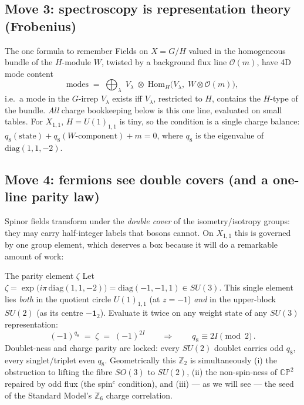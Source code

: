 \documentclass[11pt]{article}
\newcommand{\X}{X_{1,1}}
\newcommand{\CP}{\mathbb{CP}}
\begin{document}
\subsection{Move 3: spectroscopy is representation theory (Frobenius)}

\begin{toolbox}{The one formula to remember}
Fields on $X=G/H$ valued in the homogeneous bundle of the $H$-module $W$, twisted by a
background flux line $\mathcal O(m)$, have 4D mode content
\[
\text{modes} \;=\; \bigoplus_{\lambda}\; V_\lambda \;\otimes\;
\mathrm{Hom}_H\!\big(V_\lambda,\; W\otimes \mathcal O(m)\big),
\]
i.e.\ a mode in the $G$-irrep $V_\lambda$ exists iff $V_\lambda$, restricted to $H$, contains
the $H$-type of the bundle. \emph{All} charge bookkeeping below is this one line, evaluated
on small tables. For $\X$, $H=U(1)_{1,1}$ is tiny, so the condition is a single charge
balance: $q_8(\text{state}) + q_8(W\text{-component}) + m = 0$, where $q_8$ is the eigenvalue
of $\mathrm{diag}(1,1,-2)$.
\end{toolbox}

\subsection{Move 4: fermions see double covers (and a one-line parity law)}

Spinor fields transform under the \emph{double cover} of the isometry/isotropy groups: they
may carry half-integer labels that bosons cannot. On $\X$ this is governed by one group
element, which deserves a box because it will do a remarkable amount of work:

\begin{toolbox}{The parity element $\zeta$}
Let $\zeta=\exp\big(i\pi\,\mathrm{diag}(1,1,-2)\big)=\mathrm{diag}(-1,-1,1)\in SU(3)$.
This single element lies \emph{both} in the quotient circle $U(1)_{1,1}$ (at $z=-1$)
\emph{and} in the upper-block $SU(2)$ (as its centre $-\mathbf 1_2$). Evaluate it twice on
any weight state of any $SU(3)$ representation:
\[
(-1)^{q_8} \;=\; \zeta \;=\; (-1)^{2I}
\qquad\Longrightarrow\qquad
\boxed{\,q_8 \equiv 2I \pmod 2\,}.
\]
Doublet-ness and charge parity are locked: every $SU(2)$ doublet carries odd $q_8$, every
singlet/triplet even $q_8$. Geometrically this $\mathbb Z_2$ is simultaneously (i) the
obstruction to lifting the fibre $SO(3)$ to $SU(2)$, (ii) the non-spin-ness of $\CP^2$
repaired by odd flux (the spin$^c$ condition), and (iii) --- as we will see --- the seed of the
Standard Model's $\mathbb Z_6$ charge correlation.
\end{toolbox}
\end{document}
